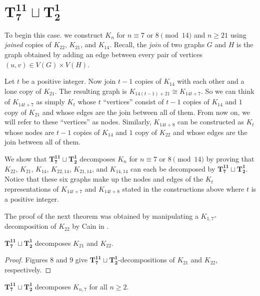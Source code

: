 \chapter{$\mathbf{T_{7}^{11}\sqcup T_{2}^{1}}$} \label{chap:special case}
To begin this case. we construct $K_{n}$ for $n \equiv 7 \textrm{ or } 8 \pmod{14}$ and $n\geq 21$ using \textit{joined} copies of $K_{22}$, $K_{21}$, and $K_{14}$. Recall, the \textit{join} of two graphs $G$ and $H$ is the graph obtained by adding an edge between every pair of vertices $(u,v)\in V(G)\times V(H)$.

Let $t$ be a positive integer. Now join $t-1$ copies of $K_{14}$ with each other and a lone copy of $K_{21}$. The resulting graph is $K_{14(t-1)+21} \cong K_{14t+7}$. So we can think of $K_{14t+7}$ as simply $K_{t}$ whose $t$ ``vertices'' consist of $t-1$ copies of $K_{14}$ and $1$ copy of $K_{21}$ and whose edges are the join between all of them. From now on, we will refer to these ``vertices'' as nodes. Similarly, $K_{14t+8}$ can be constructed as $K_{t}$ whose nodes are $t-1$ copies of $K_{14}$ and $1$ copy of $K_{22}$ and whose edges are the join between all of them.

We show that $\mathbf{T_{7}^{11}}\sqcup\mathbf{T_{2}^{1}}$ decomposes $K_{n}$ for $n\equiv7 \textrm{ or }8\pmod{14}$ by proving that $K_{22}$, $K_{21}$, $K_{14}$, $K_{22,14}$, $K_{21,14}$, and $K_{14,14}$ can each be decomposed by $\mathbf{T_{7}^{11}}\sqcup\mathbf{T_{2}^{1}}$. Notice that these six graphs make up the nodes and edges of the $K_{t}$ representations of $K_{14t+7}$ and $K_{14t+8}$ stated in the constructions above where $t$ is a positive integer.\newline

\noindent The proof of the next theorem was obtained by manipulating a $K_{1,7}$-decomposition of $K_{22}$ by Cain in \cite{bib:Cain}.

\begin{thm}\label{thm:PCstarpath}
    $\mathbf{T_{7}^{11}}\sqcup\mathbf{T_{2}^{1}}$ decomposes $K_{21}$ and $K_{22}$.
\end{thm}

\begin{proof}
     Figures 8 and 9 give $\mathbf{T_{7}^{11}}\sqcup\mathbf{T_{2}^{1}}$-decompositions of $K_{21}$ and $K_{22}$, respectively.%
\end{proof}
\newpage
\begin{thm} \label{thm:K_n,7}
    $\mathbf{T_{7}^{11}}\sqcup\mathbf{T_{2}^{1}}$ decomposes $K_{n,7}$ for all $n\geq 2$.
\end{thm}

